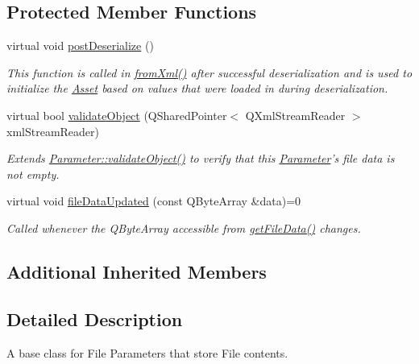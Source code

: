 \subsection*{Protected Member Functions}
\begin{DoxyCompactItemize}
\item 
virtual void \hyperlink{class_picto_1_1_file_parameter_a0c5b14270f5486397d2bc0d71b64bcd4}{post\-Deserialize} ()
\begin{DoxyCompactList}\small\item\em This function is called in \hyperlink{class_picto_1_1_asset_a8bed4da09ecb1c07ce0dab313a9aba67}{from\-Xml()} after successful deserialization and is used to initialize the \hyperlink{class_picto_1_1_asset}{Asset} based on values that were loaded in during deserialization. \end{DoxyCompactList}\item 
\hypertarget{class_picto_1_1_file_parameter_ac8e70960eed0516f77c731a415b364be}{virtual bool \hyperlink{class_picto_1_1_file_parameter_ac8e70960eed0516f77c731a415b364be}{validate\-Object} (Q\-Shared\-Pointer$<$ Q\-Xml\-Stream\-Reader $>$ xml\-Stream\-Reader)}\label{class_picto_1_1_file_parameter_ac8e70960eed0516f77c731a415b364be}

\begin{DoxyCompactList}\small\item\em Extends \hyperlink{class_picto_1_1_parameter_a94c0e4191ffcc0bd642b647d24557082}{Parameter\-::validate\-Object()} to verify that this \hyperlink{class_picto_1_1_parameter}{Parameter}'s file data is not empty. \end{DoxyCompactList}\item 
virtual void \hyperlink{class_picto_1_1_file_parameter_ae16da57fb69a636ec2322470dc5e4c69}{file\-Data\-Updated} (const Q\-Byte\-Array \&data)=0
\begin{DoxyCompactList}\small\item\em Called whenever the Q\-Byte\-Array accessible from \hyperlink{class_picto_1_1_file_parameter_aeb76b3e3e5f153644c1beac7a649b067}{get\-File\-Data()} changes. \end{DoxyCompactList}\end{DoxyCompactItemize}
\subsection*{Additional Inherited Members}


\subsection{Detailed Description}
A base class for File Parameters that store File contents. 

